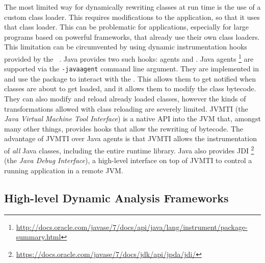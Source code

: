 The most limited way for dynamically rewriting \java{} classes at run time
is the use of a custom class loader.
This requires modifications to the application,
so that it uses that class loader.
This can be problematic for applications,
especially for large programs based on powerful frameworks,
that already use their own class loaders.
This limitation can be circumvented by using dynamic instrumentation
hooks provided by the \jvm{}~\citep{lindholmJavaVirtualMachine}.
Java provides two such hooks: \java{} agents and \jvmti{}.
Java agents%
\footnote{\url{http://docs.oracle.com/javase/7/docs/api/java/lang/instrument/package-summary.html}} 
are supported via the \texttt{-javaagent} \jvm{} command line argument.
They are implemented in \java{} and use the  package to interact with the \jvm{}.
This allows them to get notified when classes are about to get loaded,
and it allows them to modify the class bytecode.
They can also modify and reload already loaded classes,
however the kinds of transformations allowed with class reloading are severely limited.
JVMTI (the \emph{Java Virtual Machine Tool Interface}) is a native API into the JVM that, 
amongst many other things, provides hooks that allow the
rewriting of bytecode.
The advantage of JVMTI over Java agents is that JVMTI allows the instrumentation of \emph{all} Java classes, including the entire runtime library.
Java also provides JDI%
\footnote{\url{https://docs.oracle.com/javase/7/docs/jdk/api/jpda/jdi/}}
(the \emph{Java Debug Interface}), 
a high-level interface on top of JVMTI to control a running application in a remote JVM.

\subsection*{High-level Dynamic Analysis Frameworks}

